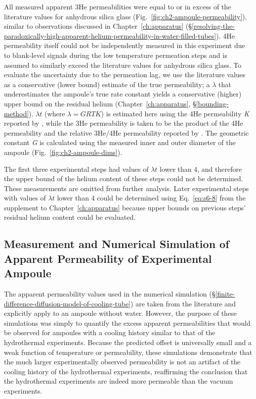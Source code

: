 All measured apparent 3He permeabilities were equal to or in excess of the literature values for anhydrous silica glass (Fig.~\ref{fig:ch2-ampoule-permeability}),
similar to observations discussed in Chapter~\ref{ch:apparatus} (\S\ref{resolving-the-paradoxically-high-apparent-helium-permeability-in-water-filled-tubes}). 4He permeability itself could not be independently measured in this
experiment due to blank-level signals during the low temperature permeation steps and is assumed to similarly exceed the literature values for anhydrous silica glass.
To evaluate the uncertainty due to the permeation lag, we use the literature values as a conservative (lower bound) estimate of the true permeability; a $\lambda$ that underestimates the ampoule's true rate constant yields a conservative (higher) upper bound on the residual helium (Chapter~\ref{ch:apparatus}, \S\ref{bounding-method}).
$\lambda t$ (where $\lambda = GRTK$) is estimated here using the 4He
permeability \emph{K} reported by \citet{swets1961}, while the 3He permeability
is taken to be the product of the 4He permeability and the relative 3He/4He permeability reported by \citet{jones1953}. The geometric constant \emph{G} is calculated using the measured inner and
outer diameter of the ampoule (Fig.~\ref{fig:ch2-ampoule-dims}).

The first three experimental steps had values of $\lambda t$ lower than 4, and therefore
the upper bound of the helium content of these steps could not be determined. These measurements are omitted
from further analysis. Later experimental steps with values of $\lambda t$ lower than 4 could be determined
using Eq.~\eqref{eq:s6-8} from the supplement to Chapter~\ref{ch:apparatus} because upper bounds on previous steps' residual helium
content could be evaluated.

\subsection{Measurement and Numerical Simulation of Apparent Permeability of Experimental Ampoule}\label{internal-measurement-of-ampoule-apparent-permeability}

The apparent permeability values used in the numerical simulation (\S\ref{finite-difference-diffusion-model-of-cooling-tube}) are taken from the literature \citep{swets1961,jones1953} and explicitly apply to
an ampoule without water. However, the purpose of these simulations was simply
to quantify the excess apparent permeabilities that would be observed for ampoules
with a cooling history similar to that of the hydrothermal experiments. Because
the predicted offset is universally small and a weak function of temperature or
permeability, these simulations demonstrate that the much larger experimentally observed permeability
is not an artifact of the cooling history of the hydrothermal experiments, reaffirming the conclusion
that the hydrothermal experiments are indeed more permeable than the vacuum experiments.

